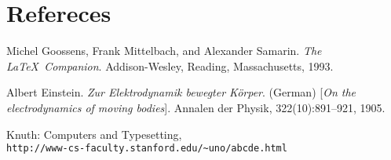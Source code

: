\documentclass[a4paper,10pt]{report}
\begin{document}
\section{Refereces}

\begin{thebibliography}{9}
Michel Goossens, Frank Mittelbach, and Alexander Samarin. 
\textit{The \LaTeX\ Companion}. 
Addison-Wesley, Reading, Massachusetts, 1993.
 
Albert Einstein. 
\textit{Zur Elektrodynamik bewegter K{\"o}rper}. (German) 
[\textit{On the electrodynamics of moving bodies}]. 
Annalen der Physik, 322(10):891–921, 1905.
 
Knuth: Computers and Typesetting,
\\\texttt{http://www-cs-faculty.stanford.edu/\~{}uno/abcde.html}
\end{thebibliography}
 
\end{document}
